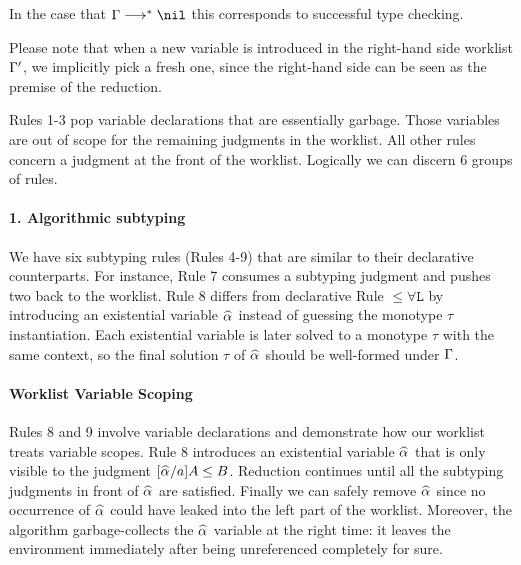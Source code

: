 \noindent In the case that $\Gm\redto\nil$ this corresponds to successful type checking.

Please note that when a new variable is introduced in the right-hand side worklist $\Gamma'$,
we implicitly pick a fresh one,
since the right-hand side can be seen as the premise of the reduction.

Rules 1-3 pop variable declarations that are essentially garbage.
Those variables are out of scope
for the remaining judgments in the worklist.
All other rules concern a judgment at the front of the worklist.
Logically we can discern 6 groups of rules.

\paragraph{{\bf 1. Algorithmic subtyping}}
We have six subtyping rules (Rules 4-9) that are similar to their
declarative counterparts. For instance, Rule 7 consumes a subtyping
judgment and pushes two back to the worklist.  Rule 8 differs from
declarative Rule $\mathtt{{\le}{\forall}L}$ by introducing an existential
variable $\al$ instead of guessing the monotype $\tau$
instantiation. Each existential variable is later solved to a
monotype $\tau$ with the same context, so the final solution $\tau$ of
$\al$ should be well-formed under $\Gamma$.

\paragraph{Worklist Variable Scoping}
Rules 8 and 9 involve variable declarations and demonstrate how our
worklist treats variable scopes. Rule 8 introduces an existential
variable $\al$ that is only visible to the judgment $[\al/a]A \le B$.
Reduction continues until all the subtyping judgments in front of $\al$
are satisfied.  Finally we can safely remove $\al$ since no occurrence
of $\al$ could have leaked into the left part of the worklist.  Moreover,
the algorithm garbage-collects the $\al$
variable at the right time: it leaves the environment immediately
after being unreferenced completely for sure.

